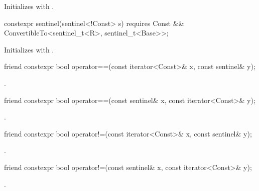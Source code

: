 \begin{itemdescr}
\pnum
\effects Initializes  with .
\end{itemdescr}

\begin{itemdecl}
constexpr sentinel(sentinel<!Const> s) requires Const &&
  ConvertibleTo<sentinel_t<R>, sentinel_t<Base>>;
\end{itemdecl}

\begin{itemdescr}
\pnum
\effects Initializes  with .
\end{itemdescr}

\begin{itemdecl}
friend constexpr bool operator==(const iterator<Const>& x, const sentinel& y);
\end{itemdecl}

\begin{itemdescr}
\pnum
\returns {}.
\end{itemdescr}

\begin{itemdecl}
friend constexpr bool operator==(const sentinel& x, const iterator<Const>& y);
\end{itemdecl}

\begin{itemdescr}
\pnum
\returns {}.
\end{itemdescr}

\begin{itemdecl}
friend constexpr bool operator!=(const iterator<Const>& x, const sentinel& y);
\end{itemdecl}

\begin{itemdescr}
\pnum
\returns {}.
\end{itemdescr}

\begin{itemdecl}
friend constexpr bool operator!=(const sentinel& x, const iterator<Const>& y);
\end{itemdecl}

\begin{itemdescr}
\pnum
\returns {}.
\end{itemdescr}

